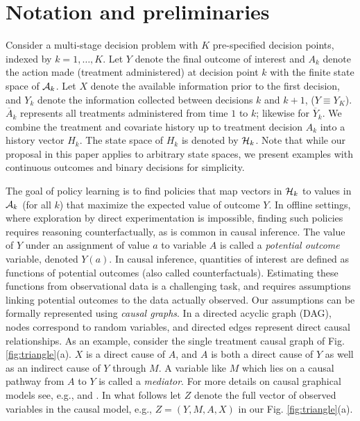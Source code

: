 \documentclass{article}
\begin{document}
\section{Notation and preliminaries} 
\label{sec:prelim}

Consider a multi-stage decision problem with $K$ pre-specified decision points, indexed by $k = 1, \ldots, K$.  Let $Y$ denote the final outcome of interest and $A_k$ denote the action made (treatment administered) at decision point $k$ with the finite state space of ${\cal A}_k$. Let $X$ denote the available information prior to the first decision, and $Y_k$ denote the information collected between decisions $k$ and $k+1$, ($Y \equiv Y_{K}$). $\overline{A}_k$ represents all treatments administered from time $1$ to $k$; likewise for $\overline{Y}_k$. We combine the treatment and covariate history up to treatment decision $A_k$ into a history vector $H_k$. The state space of $H_k$ is denoted by ${{\cal H}_k}$. Note that while our proposal in this paper applies to arbitrary state spaces,
we
present examples with continuous outcomes and binary decisions for simplicity.

The goal of policy learning is to find
policies that map vectors in ${\cal H}_k$ to values in ${\cal A}_k$ (for all $k$)
that
maximize the expected value of outcome $Y$.
In offline settings, where exploration by direct experimentation is impossible, finding such policies requires reasoning counterfactually, as is common in causal inference.
The value of $Y$ under an assignment of value $a$ to variable $A$
is called a \emph{potential outcome} variable, denoted $Y(a)$. In causal inference, quantities of interest are defined as functions of potential outcomes (also called counterfactuals). Estimating these functions  from observational data is a challenging task, and requires assumptions linking potential outcomes to the data actually observed. Our assumptions can be formally represented using \textit{causal graphs}.  In a directed acyclic graph (DAG), nodes correspond to random variables, and directed edges represent direct causal relationships. As an example, consider the single treatment causal graph of Fig. \ref{fig:triangle}(a). $X$ is a direct cause of $A$, and $A$ is both a direct cause of $Y$ as well as an indirect cause of $Y$ through $M$. A variable like $M$ which lies on a causal pathway from $A$ to $Y$ is called a \textit{mediator}.
For more details on causal graphical models see, e.g., \citet{spirtes01causation} and \citet{pearl09causality}. In what follows let $Z$ denote the full vector of observed variables in the causal model, e.g., $Z = (Y,M,A,X)$ in our Fig. \ref{fig:triangle}(a).
\end{document}
